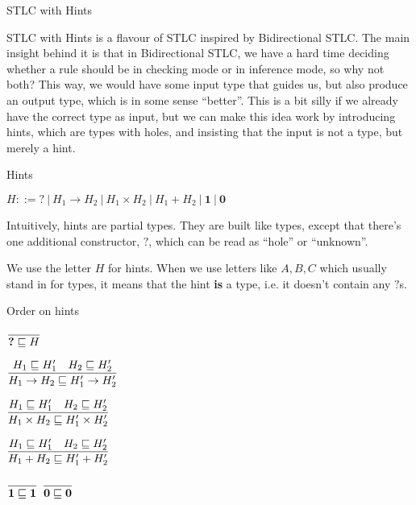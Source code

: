 \documentclass{beamer}
\newcommand{\pipe}{\ |\ }
\newcommand{\Fun}[2]{#1 \to #2}
\newcommand{\Prod}[2]{#1 \times #2}
\newcommand{\Sum}[2]{#1 + #2}
\newcommand{\Unit}{\textbf{1}}
\newcommand{\Empty}{\textbf{0}}
\newcommand{\rulename}[1]{\textsc{\footnotesize{#1}}}
\newcommand{\infrule}[3][]{\displaystyle \frac{#2}{#3} \rulename{#1}}
\begin{document}
\newcommand{\Hole}{\textbf{?}}
\newcommand{\combinehints}[2]{#1 \sqcup #2}
\newcommand{\hintorder}[2]{#1 \sqsubseteq #2}
\newcommand{\hintfor}[1]{\texttt{hint}(#1)}

\begin{frame}{STLC with Hints}

STLC with Hints is a flavour of STLC inspired by Bidirectional STLC. The main insight behind it is that in Bidirectional STLC, we have a hard time deciding whether a rule should be in checking mode or in inference mode, so why not both? This way, we would have some input type that guides us, but also produce an output type, which is in some sense ``better''. This is a bit silly if we already have the correct type as input, but we can make this idea work by introducing hints, which are types with holes, and insisting that the input is not a type, but merely a hint.

\end{frame}

\begin{frame}{Hints}

$H ::= \Hole \pipe \Fun{H_1}{H_2} \pipe \Prod{H_1}{H_2} \pipe \Sum{H_1}{H_2} \pipe \Unit \pipe \Empty$

\vspace{2em}

Intuitively, hints are partial types. They are built like types, except that there's one additional constructor, $\Hole$, which can be read as ``hole'' or ``unknown''.

\vspace{2em}

We use the letter $H$ for hints. When we use letters like $A, B, C$ which usually stand in for types, it means that the hint \textbf{is} a type, i.e. it doesn't contain any $\Hole$s.

\end{frame}

\begin{frame}{Order on hints}

\begin{center}
  $\infrule{}{\hintorder{\Hole}{H}}$

  \vspace{2em}

  $\infrule{\hintorder{H_1}{H_1'} \quad \hintorder{H_2}{H_2'}}{\hintorder{\Fun{H_1}{H_2}}{\Fun{H'_1}{H'_2}}}$

  \vspace{2em}

  $\infrule{\hintorder{H_1}{H_1'} \quad \hintorder{H_2}{H_2'}}{\hintorder{\Prod{H_1}{H_2}}{\Prod{H_1'}{H_2'}}}$

  \vspace{2em}

  $\infrule{\hintorder{H_1}{H_1'} \quad \hintorder{H_2}{H_2'}}{\hintorder{\Sum{H_1}{H_2}}{\Sum{H_1'}{H_2'}}}$

  \vspace{2em}

  $\infrule{}{\hintorder{\Unit}{\Unit}}$ \quad
  $\infrule{}{\hintorder{\Empty}{\Empty}}$
\end{center}

\end{frame}
\end{document}
